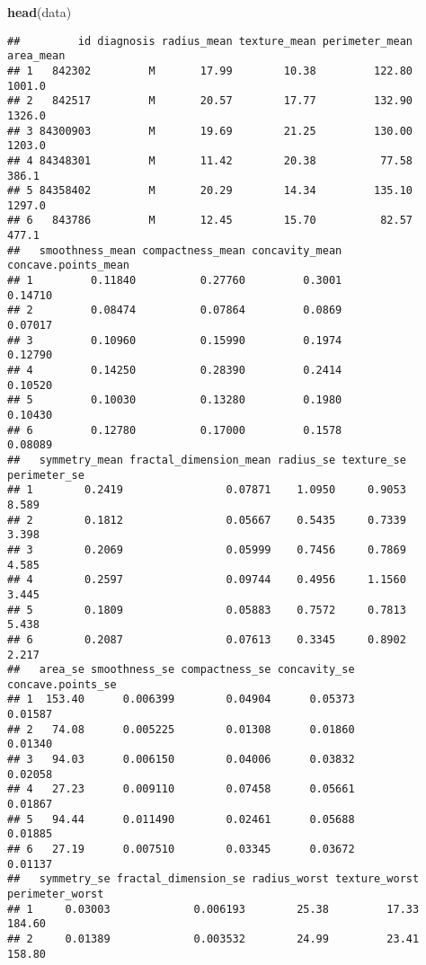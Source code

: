 \documentclass[
]{article}
\newenvironment{Shaded}{\begin{snugshade}}{\end{snugshade}}
\newcommand{\FunctionTok}[1]{\textcolor[rgb]{0.13,0.29,0.53}{\textbf{#1}}}
\newcommand{\NormalTok}[1]{#1}
\begin{document}
\begin{Shaded}
\begin{Highlighting}[]
\FunctionTok{head}\NormalTok{(data)}
\end{Highlighting}
\end{Shaded}

\begin{verbatim}
##         id diagnosis radius_mean texture_mean perimeter_mean area_mean
## 1   842302         M       17.99        10.38         122.80    1001.0
## 2   842517         M       20.57        17.77         132.90    1326.0
## 3 84300903         M       19.69        21.25         130.00    1203.0
## 4 84348301         M       11.42        20.38          77.58     386.1
## 5 84358402         M       20.29        14.34         135.10    1297.0
## 6   843786         M       12.45        15.70          82.57     477.1
##   smoothness_mean compactness_mean concavity_mean concave.points_mean
## 1         0.11840          0.27760         0.3001             0.14710
## 2         0.08474          0.07864         0.0869             0.07017
## 3         0.10960          0.15990         0.1974             0.12790
## 4         0.14250          0.28390         0.2414             0.10520
## 5         0.10030          0.13280         0.1980             0.10430
## 6         0.12780          0.17000         0.1578             0.08089
##   symmetry_mean fractal_dimension_mean radius_se texture_se perimeter_se
## 1        0.2419                0.07871    1.0950     0.9053        8.589
## 2        0.1812                0.05667    0.5435     0.7339        3.398
## 3        0.2069                0.05999    0.7456     0.7869        4.585
## 4        0.2597                0.09744    0.4956     1.1560        3.445
## 5        0.1809                0.05883    0.7572     0.7813        5.438
## 6        0.2087                0.07613    0.3345     0.8902        2.217
##   area_se smoothness_se compactness_se concavity_se concave.points_se
## 1  153.40      0.006399        0.04904      0.05373           0.01587
## 2   74.08      0.005225        0.01308      0.01860           0.01340
## 3   94.03      0.006150        0.04006      0.03832           0.02058
## 4   27.23      0.009110        0.07458      0.05661           0.01867
## 5   94.44      0.011490        0.02461      0.05688           0.01885
## 6   27.19      0.007510        0.03345      0.03672           0.01137
##   symmetry_se fractal_dimension_se radius_worst texture_worst perimeter_worst
## 1     0.03003             0.006193        25.38         17.33          184.60
## 2     0.01389             0.003532        24.99         23.41          158.80

\end{verbatim}
\end{document}
